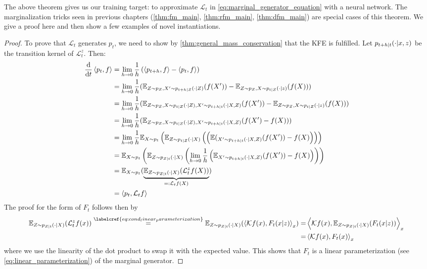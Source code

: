 \documentclass{fairmeta}
\renewcommand{\eqref}[1]{\labelcref{#1}}
\numberwithin{equation}{section}
\begin{document}
The above theorem gives us our training target: to approximate $\mathcal{L}_t$ in \cref{eq:marginal_generator_equation} with a neural network. The marginalization tricks seen in previous chapters (\cref{thm:fm_main}, \cref{thm:rfm_main}, \cref{thm:dfm_main}) are special cases of this theorem. We give a proof here and then show a few examples of novel instantiations. 
\begin{proof} 
To prove that $\mathcal{L}_t$ generates $p_t$, we need to show by \cref{thm:general_mass_conservation} that the KFE is fulfilled. Let $p_{t+h|t}(\cdot|x,z)$ be the transition kernel of $\mathcal{L}_t^z$. Then:
\begin{align*}
  \frac{\mathrm{d}}{\mathrm{d} t}\left \langle p_t, f\right \rangle&=
  \lim\limits_{h\to 0}\frac{1}{h}\left(\left \langle p_{t+h}, f\right \rangle-\left \langle p_t, f\right \rangle\right)\\
  &=\lim\limits_{h\to 0}\frac{1}{h}(\mathbb{E}_{Z\sim p_{Z}, X'\sim p_{t+h|Z}(\cdot|Z)}(f(X'))-\mathbb{E}_{Z\sim p_{Z}, X\sim p_{t|Z}(\cdot|z)}(f(X)))\\
  &=\lim\limits_{h\to 0}\frac{1}{h}(\mathbb{E}_{Z\sim p_{Z}, X\sim p_{t|Z}(\cdot|Z), X'\sim p_{t+h|t}(\cdot|X,Z)}(f(X'))-\mathbb{E}_{Z\sim p_{Z}, X\sim p_{t|Z}(\cdot|z)}(f(X)))\\
  &=\lim\limits_{h\to 0}\frac{1}{h}(\mathbb{E}_{Z\sim p_{Z}, X\sim p_{t|Z}(\cdot|Z), X'\sim p_{t+h|t}(\cdot|X,Z)}(f(X')-f(X)))\\
&=\lim\limits_{h\to 0}\frac{1}{h}\mathbb{E}_{X\sim p_t}\left(\mathbb{E}_{Z\sim p_{t|Z}(\cdot|X)}\left(\left(\mathbb{E}(_{X'\sim p_{t+h|t}(\cdot|X,Z)}(f(X'))-f(X)\right)\right)\right)\\
&=\mathbb{E}_{X\sim p_t}\left(\mathbb{E}_{Z\sim p_{Z|t}(\cdot|X)}\left(\lim\limits_{h\to 0}\frac{1}{h}\left(\mathbb{E}_{X'\sim p_{t+h|t}(\cdot|X,Z)}(f(X'))-f(X)\right)\right)\right)\\
  &=\mathbb{E}_{X\sim p_t}(\underbrace{\mathbb{E}_{Z\sim p_{Z|t}(\cdot|X)}(\mathcal{L}_t^zf(X))}_{=:\mathcal{L}_tf(X)})\\
  &=\left \langle p_t, \mathcal{L}_tf\right \rangle
\end{align*}
The proof for the form of $F_t$ follows then by
\begin{align*}
\mathbb{E}_{Z\sim p_{Z|t}(\cdot|X)}(\mathcal{L}_t^zf(x))
\overset{\eqref{eq:cond_linear_parameterization}}{=}\mathbb{E}_{Z\sim p_{Z|t}(\cdot|X)}(\ip{\mathcal{K}f(x),F_t(x|z)}_{x})=&\ip{\mathcal{K}f(x),\mathbb{E}_{Z\sim p_{Z|t}(\cdot|X)}(F_t(x|z))}_{x}\\
=&\ip{\mathcal{K}f(x),F_t(x)}_{x}
\end{align*}
where we use the linearity of the dot product to swap it with the expected value. This shows that $F_t$ is a linear parameterization (see \cref{eq:linear_parameterization}) of the marginal generator.
\end{proof}
\end{document}
